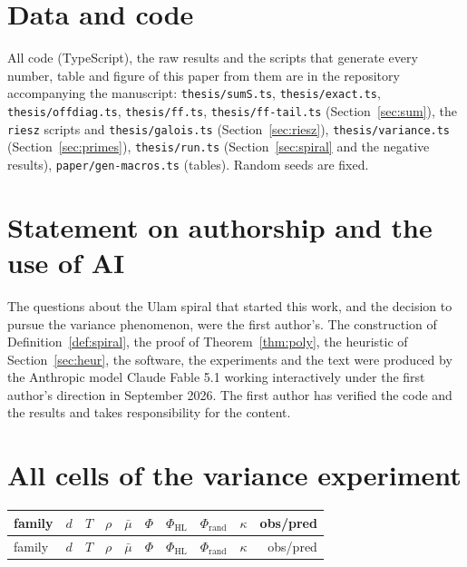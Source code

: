 \documentclass[11pt,a4paper]{article}
\theoremstyle{remark}\newtheorem{remark}[theorem]{Remark}
\begin{document}
\section*{Data and code}

All code (TypeScript), the raw results and the scripts that generate every number, table and figure of
this paper from them are in the repository accompanying the manuscript: \texttt{thesis/sumS.ts},
\texttt{thesis/exact.ts}, \texttt{thesis/offdiag.ts}, \texttt{thesis/ff.ts}, \texttt{thesis/ff-tail.ts}
(Section~\ref{sec:sum}),
the \texttt{riesz} scripts and \texttt{thesis/galois.ts} (Section~\ref{sec:riesz}),
\texttt{thesis/variance.ts} (Section~\ref{sec:primes}),
\texttt{thesis/run.ts} (Section~\ref{sec:spiral} and the negative results),
\texttt{paper/gen-macros.ts} (tables). Random seeds are fixed.

\section*{Statement on authorship and the use of AI}

The questions about the Ulam spiral that started this work, and the decision to pursue the variance
phenomenon, were the first author's. The construction of Definition~\ref{def:spiral}, the proof of
Theorem~\ref{thm:poly}, the heuristic of Section~\ref{sec:heur}, the software, the experiments and the
text were produced by the Anthropic model Claude Fable 5.1 working interactively under the first
author's direction in September 2026. The first author has verified the code and the results and takes
responsibility for the content.




\appendix
\section{All cells of the variance experiment}\label{app:cells}

\begin{center}\footnotesize
\begin{longtable}{llrrrrrrrr}
\toprule
family & $d$ & $T$ & $\rho$ & $\bar\mu$ & $\Phi$ & $\Phi_{\mathrm{HL}}$ & $\Phi_{\mathrm{rand}}$ & $\kappa$ & obs/pred\\
\midrule
\endfirsthead
\toprule
family & $d$ & $T$ & $\rho$ & $\bar\mu$ & $\Phi$ & $\Phi_{\mathrm{HL}}$ & $\Phi_{\mathrm{rand}}$ & $\kappa$ & obs/pred\\
\midrule
\endhead

\end{longtable}
\end{center}
\end{document}
